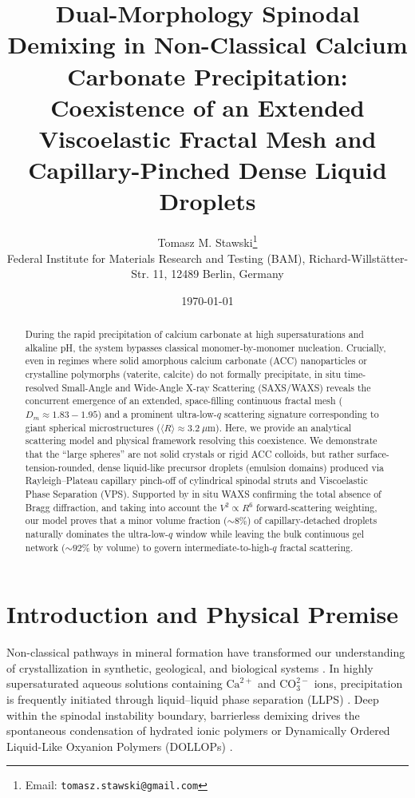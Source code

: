 \documentclass[11pt,a4paper]{article}
\title{\textbf{Dual-Morphology Spinodal Demixing in Non-Classical Calcium Carbonate Precipitation: Coexistence of an Extended Viscoelastic Fractal Mesh and Capillary-Pinched Dense Liquid Droplets}}
\author{Tomasz M. Stawski\thanks{Email: \texttt{tomasz.stawski@gmail.com}} \\
\small Federal Institute for Materials Research and Testing (BAM), Richard-Willst{\"a}tter-Str. 11, 12489 Berlin, Germany}
\date{\today}
\begin{document}
\maketitle

\begin{abstract}
During the rapid precipitation of calcium carbonate at high supersaturations and alkaline pH, the system bypasses classical monomer-by-monomer nucleation. Crucially, even in regimes where solid amorphous calcium carbonate (ACC) nanoparticles or crystalline polymorphs (vaterite, calcite) do not formally precipitate, in situ time-resolved Small-Angle and Wide-Angle X-ray Scattering (SAXS/WAXS) reveals the concurrent emergence of an extended, space-filling continuous fractal mesh ($D_m \approx 1.83 - 1.95$) and a prominent ultra-low-$q$ scattering signature corresponding to giant spherical microstructures ($\langle R \rangle \approx 3.2\ \mu\mathrm{m}$). Here, we provide an analytical scattering model and physical framework resolving this coexistence. We demonstrate that the ``large spheres'' are not solid crystals or rigid ACC colloids, but rather surface-tension-rounded, dense liquid-like precursor droplets (emulsion domains) produced via Rayleigh--Plateau capillary pinch-off of cylindrical spinodal struts and Viscoelastic Phase Separation (VPS). Supported by in situ WAXS confirming the total absence of Bragg diffraction, and taking into account the $V^2 \propto R^6$ forward-scattering weighting, our model proves that a minor volume fraction ($\sim 8\%$) of capillary-detached droplets naturally dominates the ultra-low-$q$ window while leaving the bulk continuous gel network ($\sim 92\%$ by volume) to govern intermediate-to-high-$q$ fractal scattering.
\end{abstract}

\section{Introduction and Physical Premise}

Non-classical pathways in mineral formation have transformed our understanding of crystallization in synthetic, geological, and biological systems \cite{deyoreo2015crystallization, gebauer2008stable, stawski2016formation, stawski2019nucleation}. In highly supersaturated aqueous solutions containing $\mathrm{Ca}^{2+}$ and $\mathrm{CO}_3^{2-}$ ions, precipitation is frequently initiated through liquid--liquid phase separation (LLPS) \cite{gower2000biomimetic, gower2008biomimetic, wallace2013microscopic, bewernitz2012metastable}. Deep within the spinodal instability boundary, barrierless demixing drives the spontaneous condensation of hydrated ionic polymers or Dynamically Ordered Liquid-Like Oxyanion Polymers (DOLLOPs) \cite{cahn1965phase, demichelis2011stable}. 
\end{document}
